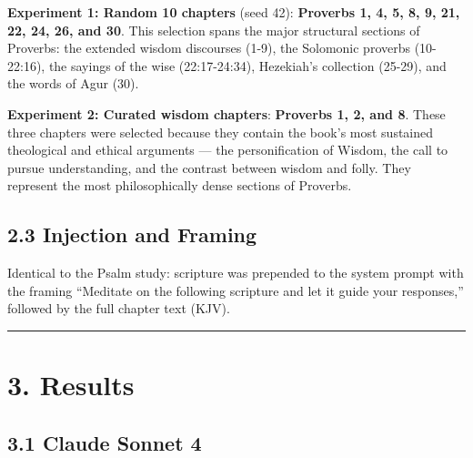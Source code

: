 \documentclass[10pt, letterpaper, twocolumn]{article}
\begin{document}
\textbf{Experiment 1: Random 10 chapters} (seed 42): \textbf{Proverbs 1, 4, 5, 8, 9, 21, 22, 24, 26, and 30}. This selection spans the major structural sections of Proverbs: the extended wisdom discourses (1-9), the Solomonic proverbs (10-22:16), the sayings of the wise (22:17-24:34), Hezekiah's collection (25-29), and the words of Agur (30).

\textbf{Experiment 2: Curated wisdom chapters}: \textbf{Proverbs 1, 2, and 8}. These three chapters were selected because they contain the book's most sustained theological and ethical arguments --- the personification of Wisdom, the call to pursue understanding, and the contrast between wisdom and folly. They represent the most philosophically dense sections of Proverbs.

\subsection*{2.3 Injection and Framing}\label{injection-and-framing}

Identical to the Psalm study: scripture was prepended to the system prompt with the framing ``Meditate on the following scripture and let it guide your responses,'' followed by the full chapter text (KJV).

\begin{center}\rule{0.5\linewidth}{0.5pt}\end{center}

\section*{3. Results}\label{results}

\subsection*{3.1 Claude Sonnet 4}\label{claude-sonnet-4}
\end{document}
